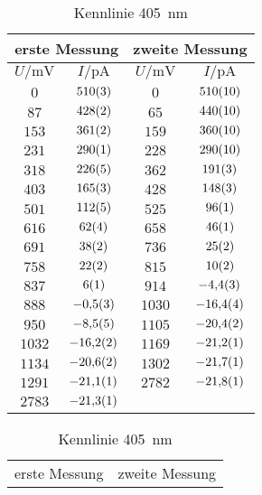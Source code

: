 \begin{table}[H]
   \centering
\parbox{0.475\linewidth}{\centering
\caption{Kennlinie \SI{436}{nm}}
\begin{tabular}{cc||cc}
\hline\multicolumn{2}{c||}{erste Messung} & \multicolumn{2}{c}{zweite Messung}\\

\hline
$U / \unit{\milli\volt}$ & $I / \unit{\pico\ampere}$ & $U / \unit{\milli\volt}$ & $I / \unit{\pico\ampere}$ \\ 
\hline
$\num{0}$ & $\num{510\pm 3}$ & $\num{0}$ & $\num{510\pm 10}$ \\
$\num{87}$ & $\num{428\pm 2}$ & $\num{65}$ & $\num{440\pm 10}$ \\
$\num{153}$ & $\num{361\pm 2}$ & $\num{159}$ & $\num{360\pm 10}$ \\
$\num{231}$ & $\num{290\pm 1}$ & $\num{228}$ & $\num{290\pm 10}$ \\
$\num{318}$ & $\num{226\pm 5}$ & $\num{362}$ & $\num{191\pm 3}$ \\
$\num{403}$ & $\num{165\pm 3}$ & $\num{428}$ & $\num{148\pm 3}$ \\
$\num{501}$ & $\num{112\pm 5}$ & $\num{525}$ & $\num{96\pm 1}$ \\
$\num{616}$ & $\num{62\pm 4}$ & $\num{658}$ & $\num{46\pm 1}$ \\
$\num{691}$ & $\num{38\pm 2}$ & $\num{736}$ & $\num{25\pm 2}$ \\
$\num{758}$ & $\num{22\pm 2}$ & $\num{815}$ & $\num{10\pm 2}$ \\
$\num{837}$ & $\num{6\pm 1}$ & $\num{914}$ & $\num{-4.4\pm 0.3}$ \\
$\num{888}$ & $\num{-0.5\pm 0.3}$ & $\num{1030}$ & $\num{-16.4\pm 0.4}$ \\
$\num{950}$ & $\num{-8.5\pm 0.5}$ & $\num{1105}$ & $\num{-20.4\pm 0.2}$ \\
$\num{1032}$ & $\num{-16.2\pm 0.2}$ & $\num{1169}$ & $\num{-21.2\pm 0.1}$ \\
$\num{1134}$ & $\num{-20.6\pm 0.2}$ & $\num{1302}$ & $\num{-21.7\pm 0.1}$ \\
$\num{1291}$ & $\num{-21.1\pm 0.1}$ & $\num{2782}$ & $\num{-21.8\pm 0.1}$ \\
$\num{2783}$ & $\num{-21.3\pm 0.1}$ &    &    \\
\hline\end{tabular}
\label{kennlinie_436nm}
}\quad\parbox{0.475\linewidth}{\centering
\caption{Kennlinie \SI{405}{nm}}
\begin{tabular}{cc||cc}
\hline\multicolumn{2}{c||}{erste Messung} & \multicolumn{2}{c}{zweite Messung}\\


\end{tabular}}
\end{table}
